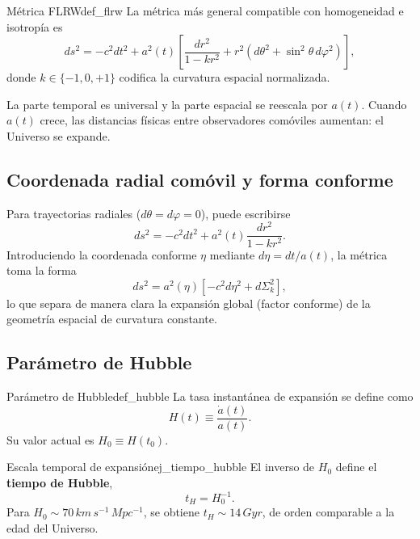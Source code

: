 \begin{definicion}{Métrica FLRW}{def_flrw}
La métrica más general compatible con homogeneidad e isotropía es
\begin{equation}
  \boxed{ds^2 = -c^2dt^2 + a^2(t)\left[\frac{dr^2}{1-kr^2} + r^2\left(d\theta^2 + \sin^2\theta\,d\varphi^2\right)\right],}
  \label{eq:flrw_metric}
\end{equation}
donde $k\in\{-1,0,+1\}$ codifica la curvatura espacial normalizada.
\end{definicion}

La parte temporal es universal y la parte espacial se reescala por $a(t)$. Cuando $a(t)$ crece, las distancias físicas entre observadores comóviles aumentan: el Universo se expande.

\subsection{Coordenada radial comóvil y forma conforme}

Para trayectorias radiales ($d\theta=d\varphi=0$), puede escribirse
\begin{equation}
  ds^2 = -c^2dt^2 + a^2(t)\frac{dr^2}{1-kr^2}.
\end{equation}
Introduciendo la coordenada conforme $\eta$ mediante $d\eta = dt/a(t)$, la métrica toma la forma
\begin{equation}
  ds^2 = a^2(\eta)\left[-c^2d\eta^2 + d\Sigma_k^2\right],
\end{equation}
lo que separa de manera clara la expansión global (factor conforme) de la geometría espacial de curvatura constante.

\subsection{Parámetro de Hubble}

\begin{definicion}{Parámetro de Hubble}{def_hubble}
La tasa instantánea de expansión se define como
\begin{equation}
  H(t) \equiv \frac{\dot a(t)}{a(t)}.
  \label{eq:def_hubble}
\end{equation}
Su valor actual es $H_0 \equiv H(t_0)$.
\end{definicion}

\begin{ejemplo}{Escala temporal de expansión}{ej_tiempo_hubble}
El inverso de $H_0$ define el \textbf{tiempo de Hubble},
\begin{equation}
  t_H = H_0^{-1}.
\end{equation}
Para $H_0\sim70\,\si{km\,s^{-1}\,Mpc^{-1}}$, se obtiene $t_H\sim14\,\si{Gyr}$, de orden comparable a la edad del Universo.
\end{ejemplo}

